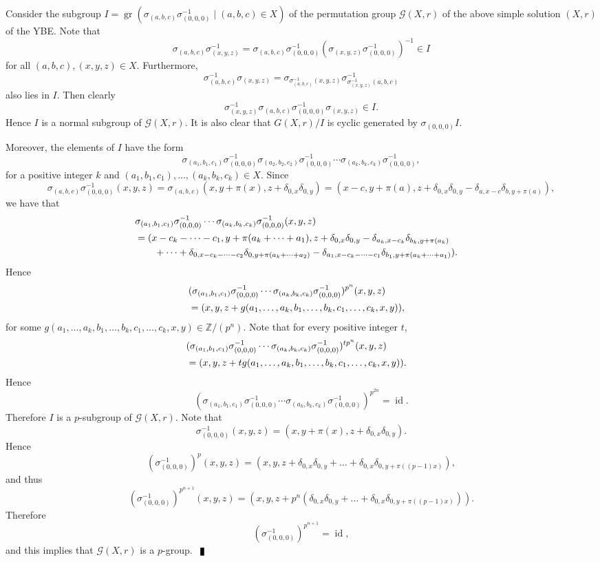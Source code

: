 \documentclass[10pt]{article}
\newcommand{\Z}{\mathbb{Z}}
\newcommand{\id}{\operatorname{id}}
\newcommand{\gr}{\operatorname{gr}}
\newenvironment{proof}{\par\noindent{ Proof.}}{$\qed$\par\bigskip}
\newcommand{\qed}{\enspace\vrule  height6pt  width4pt  depth2pt}
\begin{document}
\begin{proof}
Consider the subgroup $I=\gr(\sigma_{(a,b,c)}\sigma^{-1}_{(0,0,0)}\mid (a,b,c)\in X)$ of the permutation group $\mathcal{G}(X,r)$ of the above simple solution $(X,r)$ of the YBE.  Note  that
$$\sigma_{(a,b,c)}\sigma^{-1}_{(x,y,z)}=\sigma_{(a,b,c)}\sigma^{-1}_{(0,0,0)}(\sigma_{(x,y,z)}\sigma^{-1}_{(0,0,0)})^{-1} \in I$$ for all $(a,b,c),(x,y,z)\in X$.
Furthermore,
$$\sigma^{-1}_{(a,b,c)}\sigma_{(x,y,z)}=\sigma_{\sigma^{-1}_{(a,b,c)}(x,y,z)}\sigma^{-1}_{\sigma^{-1}_{(x,y,z)}(a,b,c)}$$
also lies in $I$. Then clearly
$$\sigma_{(x,y,z)}^{-1}\sigma_{(a,b,c)}\sigma^{-1}_{(0,0,0)}\sigma_{(x,y,z)}\in I.$$
Hence $I$ is a normal subgroup of $\mathcal{G}(X,r)$. It is also clear that  $G(X, r)/I$
is cyclic generated by $\sigma_{(0,0,0)}I$.

Moreover, the elements of $I$ have the form
$$\sigma_{(a_1,b_1,c_1)}\sigma^{-1}_{(0,0,0)}\sigma_{(a_2,b_2,c_2)}\sigma^{-1}_{(0,0,0)}\cdots \sigma_{(a_k,b_k,c_k)}\sigma^{-1}_{(0,0,0)},$$
for a positive integer $k$ and $(a_1,b_1,c_1),\dots ,(a_k,b_k,c_k)\in X$.
Since
$$\sigma_{(a,b,c)}\sigma^{-1}_{(0,0,0)}(x,y,z)=\sigma_{(a,b,c)}(x,y+\pi(x),z+\delta_{0,x}\delta_{0,y})=(x-c,y+\pi(a),z+\delta_{0,x}\delta_{0,y}-\delta_{a,x-c}\delta_{b,y+\pi(a)}),$$
we have that
\begin{eqnarray*}
	\lefteqn{\sigma_{(a_1,b_1,c_1)}\sigma^{-1}_{(0,0,0)}\cdots \sigma_{(a_k,b_k,c_k)}\sigma^{-1}_{(0,0,0)}(x,y,z)}\\
	&=(x-c_k-\dots -c_1,y+\pi(a_k+\dots +a_1),
	z+\delta_{0,x}\delta_{0,y}-\delta_{a_k,x-c_k}\delta_{b_k,y+\pi(a_k)}\\
	&\qquad +\dots
	+\delta_{0,x-c_k-\dots -c_2}\delta_{0,y+\pi(a_k+\dots +a_2)}-\delta_{a_1,x-c_k-\dots -c_1}\delta_{b_1,y+\pi(a_k+\dots +a_1)}).
\end{eqnarray*}
Hence
\begin{eqnarray*}
	\lefteqn{(\sigma_{(a_1,b_1,c_1)}\sigma^{-1}_{(0,0,0)}\cdots \sigma_{(a_k,b_k,c_k)}\sigma^{-1}_{(0,0,0)})^{p^n}(x,y,z)}\\
	&=(x,y,	z+g(a_1,\dots, a_k,b_1,\dots ,b_k,c_1,\dots ,c_k,x,y)),
\end{eqnarray*}
for some $g(a_1,\dots, a_k,b_1,\dots ,b_k,c_1,\dots ,c_k,x,y)\in \Z/(p^n)$. Note that for every positive integer $t$,
\begin{eqnarray*}
	\lefteqn{(\sigma_{(a_1,b_1,c_1)}\sigma^{-1}_{(0,0,0)}\cdots \sigma_{(a_k,b_k,c_k)}\sigma^{-1}_{(0,0,0)})^{tp^n}(x,y,z)}\\
	&=(x,y,	z+tg(a_1,\dots, a_k,b_1,\dots ,b_k,c_1,\dots ,c_k,x,y)).
\end{eqnarray*}
Hence
$$	(\sigma_{(a_1,b_1,c_1)}\sigma^{-1}_{(0,0,0)}\cdots \sigma_{(a_k,b_k,c_k)}\sigma^{-1}_{(0,0,0)})^{p^{2n}}=\id.$$
Therefore $I$ is a $p$-subgroup of $\mathcal{G}(X,r)$. Note that
$$\sigma^{-1}_{(0,0,0)}(x,y,z)=(x,y+\pi(x),z+\delta_{0,x}\delta_{0,y}).$$
Hence
$$(\sigma^{-1}_{(0,0,0)})^{p}(x,y,z)=(x,y,z+\delta_{0,x}\delta_{0,y}+\dots +\delta_{0,x}\delta_{0,y+\pi((p-1)x)}),$$
and thus
$$(\sigma^{-1}_{(0,0,0)})^{p^{n+1}}(x,y,z)=(x,y,z+p^n(\delta_{0,x}\delta_{0,y}+\dots +\delta_{0,x}\delta_{0,y+\pi((p-1)x)})).$$
Therefore
$$(\sigma^{-1}_{(0,0,0)})^{p^{n+1}}=\id,$$
and this implies that $\mathcal{G}(X,r)$ is a $p$-group.
\end{proof}
\end{document}

